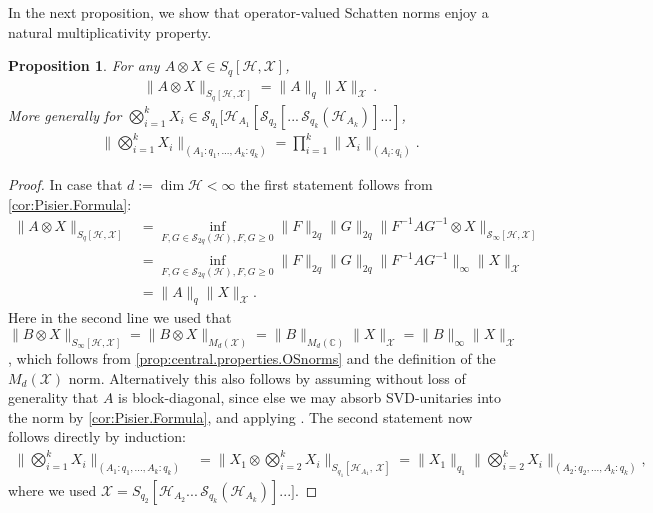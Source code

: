 \documentclass[11pt]{article}
\newcommand{\1}{\ensuremath{\mathbbm{1}}}
\theoremstyle{newdefinition}
\theoremstyle{newplain}
\newtheorem{proposition}[definition]{Proposition}
\theoremstyle{myplain}
\begin{document}
In the next proposition, we show that operator-valued Schatten norms enjoy a natural multiplicativity property.

\begin{proposition}
\label{prop:spliting.systems.left.}
For any $A\otimes X\in S_q[\mathcal{H},\mathcal{X}]$,
\begin{align}
    \|A\otimes X\|_{S_q[\mathcal{H},\mathcal{X}]}=\|A\|_q\|X\|_{\mathcal{X}}\,.
\end{align}
 More generally for $\bigotimes_{i=1}^k X_i\in \mathcal{S}_{q_1}[\mathcal{H}_{A_1}[\mathcal{S}_{q_2}[...\,\mathcal{S}_{q_k}(\mathcal{H}_{A_k})]...]$,
\begin{align} 
\bigg\|\bigotimes_{i=1}^k X_i\bigg\|_{(A_1:q_1,...,A_k:q_k)}= \prod_{i=1}^k \|X_i\|_{(A_i:q_i)}.
\end{align}
\end{proposition}
\begin{proof}
In case that $d:=\dim\mathcal{H}<\infty$ the first statement follows from \cref{cor:Pisier.Formula}: 
\begin{align}
    \|A\otimes X\|_{S_q[\mathcal{H},\mathcal{X}]} &= \inf_{F,G\in\mathcal{S}_{2q}(\mathcal{H}), F,G\geq0}\|F\|_{2q}\|G\|_{2q}\|F^{-1}AG^{-1}\otimes X\|_{\mathcal{S}_\infty[\mathcal{H},\mathcal{X}]} \\
    &=\inf_{F,G\in\mathcal{S}_{2q}(\mathcal{H}), F,G\geq0}\|F\|_{2q}\|G\|_{2q}\|F^{-1}AG^{-1}\|_\infty\|X\|_{\mathcal{X}} \\
    &= \|A\|_q\|X\|_\mathcal{X}.
\end{align} 
Here in the second line we used that $\|B\otimes X\|_{S_\infty[\mathcal{H},\mathcal{X}]}=\|B\otimes X\|_{M_d(\mathcal{X})}=\|B\|_{M_d(\mathbb{C})}\|X\|_\mathcal{X}= \|B\|_\infty\|X\|_\mathcal{X}$, which follows from \cref{prop:central.properties.OSnorms} and the definition of the $M_d(\mathcal{X})$ norm. 
Alternatively this also follows by assuming without loss of generality that $A$ is block-diagonal, since else we may absorb SVD-unitaries into the norm by \cref{cor:Pisier.Formula}, and applying \cite[Corollary 1.3]{Book.Pisier.1998}.
The second statement now follows directly by induction:
\begin{align}
   \bigg\|\bigotimes_{i=1}^k X_i\bigg\|_{(A_1:q_1,...,A_k:q_k)} &=   \bigg\|X_1\otimes \bigotimes_{i=2}^{k} X_i\bigg\|_{S_{q_1}[\mathcal{H}_{A_1},\,\mathcal{X}]} 
   = \|X_1\|_{q_1} \bigg\|\bigotimes_{i=2}^k X_i\bigg\|_{(A_2:q_2,...,A_k:q_k)},
\end{align} where we used $\mathcal{X}=S_{q_2}[\mathcal{H}_{A_2}...\,\mathcal{S}_{q_k}(\mathcal{H}_{A_k})]...]$.
\end{proof}
\end{document}
